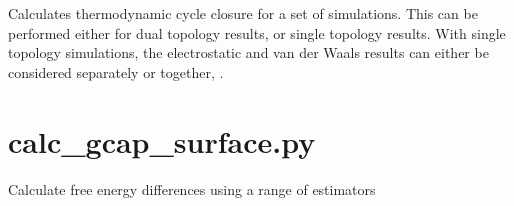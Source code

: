 \documentclass[letterpaper,10pt,english]{sphinxmanual}
\begin{document}

%
\begin{sphinxVerbatim}[commandchars=\\\{\}]
           
            
\end{sphinxVerbatim}


Calculates thermodynamic cycle closure for a set of simulations. This can be performed either for dual topology results, or single topology results. With single topology simulations, the electrostatic and van der Waals results can either be considered separately  or together, .


\section{calc\_gcap\_surface.py}
\label{\detokenize{tools:calc-gcap-surface-py}}

Calculate free energy differences using a range of estimators
\end{document}
